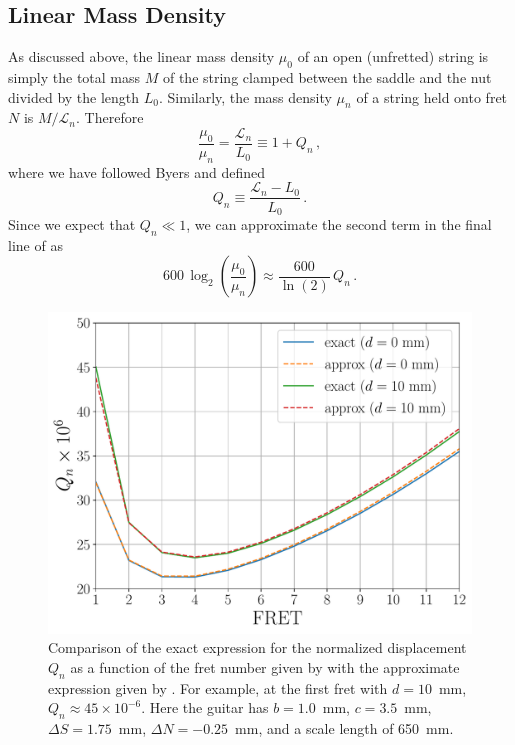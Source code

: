  \subsection{Linear Mass Density}
As discussed above, the linear mass density $\mu_0$ of an open (unfretted) string is simply the total mass $M$ of the string clamped between the saddle and the nut divided by the length $L_0$. Similarly, the mass density $\mu_n$ of a string held onto fret $N$ is $M/\mathcal{L}_n$. Therefore
 \begin{equation}
\frac{\mu_0}{\mu_n} = \frac{\mathcal{L}_n}{L_0} \equiv 1 + Q_n\, ,
 \end{equation}
where we have followed Byers and defined~\cite{ref:byers1996cgi,ref:varieschi2010icf}
 \begin{equation} \label{eqn:q_n_def}
Q_n \equiv \frac{\mathcal{L}_n - L_0}{L_0}\, .
 \end{equation}
Since we expect that $Q_n \ll 1$, we can approximate the second term in the final line of  as
 \begin{equation} \label{eqn:lmd_error}
600\, \log_2 \left(  \frac{\mu_0}{\mu_n} \right) \approx \frac{600}{\ln(2)}\, Q_n\, .
 \end{equation}

\begin{figure}
  \centering
  \includegraphics[width=5.0in]{../figures/qn_test}
  \caption{\label{fig:qn_test} Comparison of the exact expression for the normalized displacement $Q_n$ as a function of the fret number given by  with the approximate expression given by . For example, at the first fret with $d = 10$~mm, $Q_n \approx 45 \times 10^{-6}$. Here the guitar has $b = 1.0$~mm, $c = 3.5$~mm, $\Delta S = 1.75$~mm, $\Delta N = -0.25$~mm, and a scale length of 650~mm.}
\end{figure}


